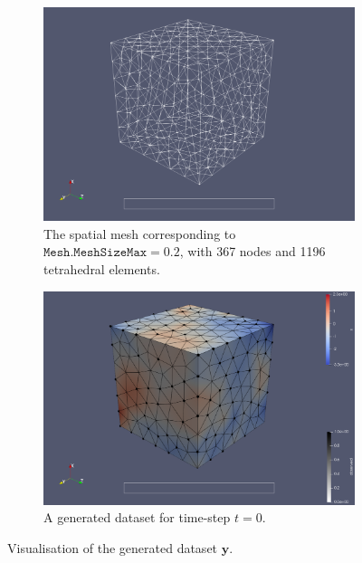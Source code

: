 \documentclass[british]{scrreprt}
\begin{document}
\begin{figure}
    \centering
    \begin{subfigure}{0.8\textwidth}
        \includegraphics{img/mesh_0.2.png}
        \caption{The spatial mesh corresponding to \( \texttt{Mesh.MeshSizeMax} = 0.2 \), with 367 nodes and 1196 tetrahedral elements.}
        \label{fig:mesh-0.2}
    \end{subfigure}
    
    \begin{subfigure}{0.8\textwidth}
        \includegraphics{img/mesh_0.2_x.png}
        \caption{A generated dataset for time-step \( t = 0 \).}
        \label{fig:mesh-0.2-x}
    \end{subfigure}
    \caption{Visualisation of the generated dataset \( \symbf{y} \).}
    \label{fig:mesh}
\end{figure}%
\end{document}
